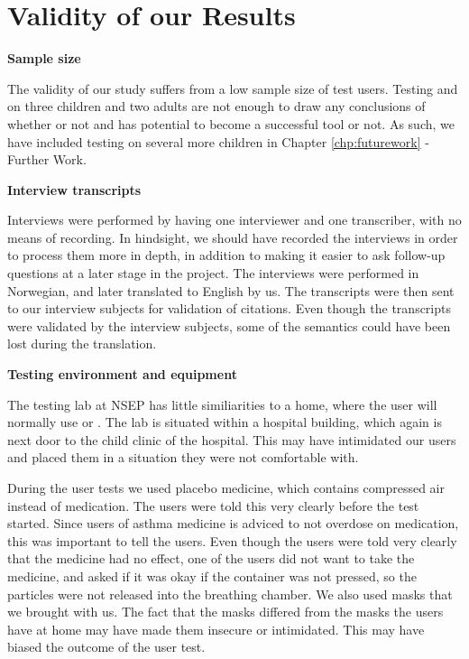 \section{Validity of our Results}
\label{sec:validity}

\textbf{Sample size}

The validity of our study suffers from a low sample size of test users. Testing \ab{} and \app{} on three children and two adults are not enough to draw any conclusions of whether or not \app{} and \ab{} has potential to become a successful tool or not. As such, we have included testing on several more children in Chapter \ref{chp:futurework} - Further Work.    

\textbf{Interview transcripts}

Interviews were performed by having one interviewer and one transcriber, with no means of recording. In hindsight, we should have recorded the interviews in order to process them more in depth, in addition to making it easier to ask follow-up questions at a later stage in the project. The interviews were performed in Norwegian, and later translated to English by us. The transcripts were then sent to our interview subjects for validation of citations. Even though the transcripts were validated by the interview subjects, some of the semantics could have been lost during the translation. 


\textbf{Testing environment and equipment}

The testing lab at NSEP has little similiarities to a home, where the user will normally use \ab{} or \app{}. The lab is situated within a hospital building, which again is next door to the child clinic of the hospital. This may have intimidated our users and placed them in a situation they were not comfortable with. 

During the user tests we used placebo medicine, which contains compressed air instead of medication. The users were told this very clearly before the test started. Since users of asthma medicine is adviced to not overdose on medication, this was important to tell the users. Even though the users were told very clearly that the medicine had no effect, one of the users did not want to take the medicine, and asked if it was okay if the container was not pressed, so the particles were not released into the breathing chamber. 
We also used masks that we brought with us. The fact that the masks differed from the masks the users have at home may have made them insecure or intimidated. This may have biased the outcome of the user test. 


